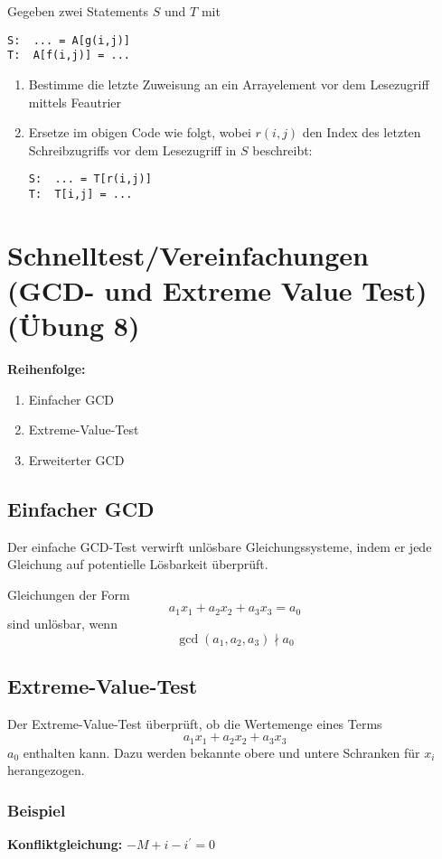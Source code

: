 \documentclass[a4paper,10pt]{article}
\begin{document}
Gegeben zwei Statements $S$ und $T$ mit
\begin{lstlisting}
S:  ... = A[g(i,j)]
T:  A[f(i,j)] = ...
\end{lstlisting}

\begin{enumerate}
    \item Bestimme die letzte Zuweisung an ein Arrayelement vor dem Lesezugriff mittels Feautrier
    \item Ersetze im obigen Code wie folgt, wobei $r(i,j)$ den Index des letzten Schreibzugriffs vor dem Lesezugriff in $S$ beschreibt:
\begin{lstlisting}
S:  ... = T[r(i,j)]
T:  T[i,j] = ...
\end{lstlisting}
\end{enumerate}

\section{Schnelltest/Vereinfachungen (GCD- und Extreme Value Test) (Übung 8)}

\textbf{Reihenfolge:}
\begin{enumerate}
    \item Einfacher GCD
    \item Extreme-Value-Test
    \item Erweiterter GCD
\end{enumerate}

\subsection{Einfacher GCD}

Der einfache GCD-Test verwirft unlösbare Gleichungssysteme, indem er jede Gleichung auf potentielle Lösbarkeit überprüft.

Gleichungen der Form
\[a_1x_1 + a_2x_2 + a_3x_3 = a_0\]
sind unlösbar, wenn
\[\gcd(a_1, a_2, a_3) \nmid a_0\]

\subsection{Extreme-Value-Test}

Der Extreme-Value-Test überprüft, ob die Wertemenge eines Terms
\[a_1x_1 + a_2x_2 + a_3x_3\]
$a_0$ enthalten kann. Dazu werden bekannte obere und untere Schranken für $x_i$ herangezogen.

\subsubsection*{Beispiel}
\textbf{Konfliktgleichung:} \( -M + i - i^\prime = 0 \)
\end{document}
